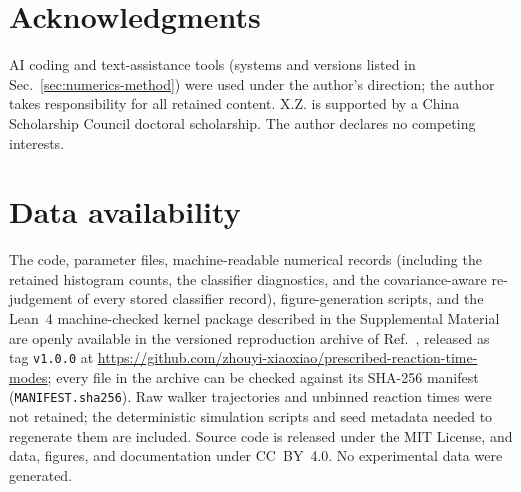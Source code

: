 \documentclass[aps,physrev,reprint,amsmath,amssymb,longbibliography,floatfix]{revtex4-2}
\begin{document}
\section*{Acknowledgments}

AI coding and text-assistance tools (systems and versions listed in
Sec.~\ref{sec:numerics-method}) were used under the author's direction; the
author takes responsibility for all retained content.  X.Z. is supported by a
China Scholarship Council doctoral scholarship.  The author declares no
competing interests.

\section*{Data availability}

The code, parameter files, machine-readable numerical records (including
the retained histogram counts, the classifier diagnostics, and the
covariance-aware re-judgement of every stored classifier record),
figure-generation scripts, and the Lean~4 machine-checked kernel package
described in the Supplemental Material are openly available in the
versioned reproduction archive of Ref.~\cite{zhouyi2026reproduction},
released as tag \texttt{v1.0.0} at
\url{https://github.com/zhouyi-xiaoxiao/prescribed-reaction-time-modes};
every file in the archive can be checked against its SHA-256 manifest
(\texttt{MANIFEST.sha256}).  Raw walker trajectories and unbinned reaction
times were not retained; the deterministic simulation scripts and seed
metadata needed to regenerate them are included.  Source code is released
under the MIT License, and data, figures, and documentation under
CC~BY~4.0.  No experimental data were generated.


\end{document}
